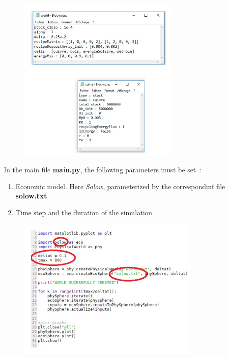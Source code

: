 \documentclass[12pt,a4paper]{article}%
\begin{document}
\begin{figure}[h]
\centering\includegraphics[width=0.7\textwidth]{figures/Parametrisation.jpg}
\end{figure}

\noindent In the main file \textbf{main.py}, the following parameters must be set~:

\begin{enumerate}
	\item Economic model. Here \textit{Solow}, parameterized by the correspondinf file \textbf{solow.txt} 
	 
	
	\item Time step and the duration of the simulation
\end{enumerate}

\begin{figure}[h]
\centering\includegraphics[width=0.8\textwidth]{figures/Parametrisation2.jpg}
\end{figure}
\end{document}
